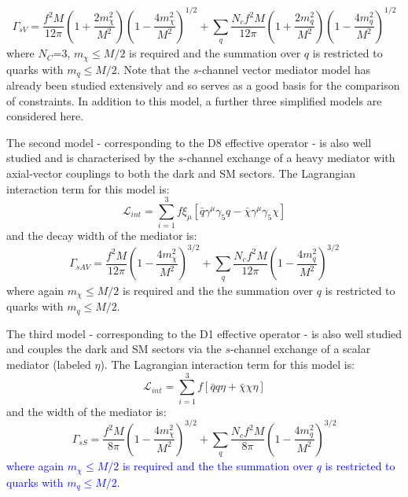 \begin{flushleft}
\begin{equation}
\label{gamma_sV}
\Gamma_{sV} = \frac{f^{2} M}{12\pi}\left(1 + \frac{2m_{\chi}^{2}}{M^{2}}\right)\left(1 - \frac{4m_{\chi}^{2}}{M^{2}}\right)^{1/2} + \sum_{\substack{q}}\frac{N_{c}f^{2}M}{12\pi}\left(1 + \frac{2m_{q}^{2}}{M^{2}}\right)\left(1 - \frac{4m_{q}^{2}}{M^{2}}\right)^{1/2}
\end{equation}
where $N_{C}$=3, $m_{\chi} \leq M/2$ is required and the summation over $q$ is restricted to quarks with $m_{q} \leq M/2$. Note that the $s$-channel vector mediator model has already been studied extensively \cite{Buchmueller:2014yoa, Chatrchyan:2013qha, Aad:2012hf, Harris:2014hga} and so serves as a good basis for the comparison of constraints. In addition to this model, a further three simplified models are considered here.

\hspace{1cm}The second model - corresponding to the D8 effective operator - is also well studied \cite{} and is characterised by the $s$-channel exchange of a heavy mediator with axial-vector couplings to both the dark and SM sectors. The Lagrangian interaction term for this model is:
\begin{equation}
\label{L_int_sAV}
\mathcal{L}_{int} = \sum\limits_{i=1}^{3} f\xi_{\mu} \left[\bar{q}\gamma^{\mu}\gamma_{5}q - \bar{\chi}\gamma^{\mu}\gamma_{5}\chi\right]
\end{equation}
and the decay width of the mediator is:
\begin{equation}
\label{gamma_sAV}
\Gamma_{sAV} = \frac{f^{2} M}{12\pi}\left(1 - \frac{4m_{\chi}^{2}}{M^{2}}\right)^{3/2} + \sum_{\substack{q}}\frac{N_{c}f^{2} M}{12\pi}\left(1 - \frac{4m_{q}^{2}}{M^{2}}\right)^{3/2}
\end{equation}
where again $m_{\chi} \leq M/2$ is required and the the summation over $q$ is restricted to quarks with $m_{q} \leq M/2$.

\hspace{1cm}The third model - corresponding to the D1 effective operator - is also well studied and couples the dark and SM sectors via the $s$-channel exchange of a scalar mediator (labeled $\eta$). The Lagrangian interaction term for this model is:
\begin{equation}
\label{L_int_sS}
\mathcal{L}_{int} = \sum\limits_{i=1}^{3} f \left[\bar{q}q\eta + \bar{\chi}\chi\eta\right]
\end{equation}
and the width of the mediator is:
\begin{equation}
\label{gamma_sS}
\Gamma_{sS} = \frac{f^{2} M}{8\pi}\left(1 - \frac{4m_{\chi}^{2}}{M^{2}}\right)^{3/2} + \sum_{\substack{q}}\frac{N_{c}f^{2} M}{8\pi}\left(1 - \frac{4m_{q}^{2}}{M^{2}}\right)^{3/2}
\end{equation}
\textcolor{blue}{where again $m_{\chi} \leq M/2$ is required and the the summation over $q$ is restricted to quarks with $m_{q} \leq M/2$.}


\end{flushleft}

